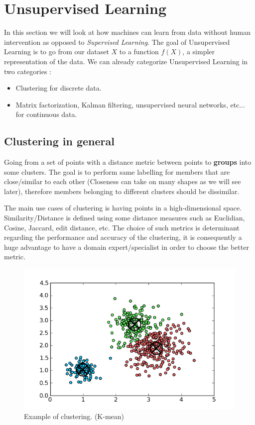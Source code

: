 

\section{Unsupervised Learning}

In this section we will look at how machines can learn from data without human intervention as opposed to \emph{Supervised Learning}. The goal of Unsupervised Learning is to go from our dataset $X$ to a function $f(X)$, a simpler representation of the data. We can already categorize Unsupervised Learning in two categories :
\begin{itemize}
	\item Clustering for discrete data.
	\item Matrix factorization, Kalman filtering, unsupervised neural networks, etc... for continuous data.
\end{itemize}

\subsection{Clustering in general}

Going from a set of points with a distance metric between points to \textbf{groups} into some clusters. The goal is to perform same labelling for members that are close/similar to each other (Closeness can take on many shapes as we will see later), therefore members belonging to different clusters should be dissimilar. 

The main use cases of clustering is having points in a high-dimensional space. Similarity/Distance is defined using some distance measures such as Euclidian, Cosine, Jaccard, edit distance, etc. The choice of such metrics is determinant regarding the performance and accuracy of the clustering, it is consequently a huge advantage to have a domain expert/specialist in order to choose the better metric.

\begin{figure}[H]%
 \centering
 \includegraphics[width=13cm]{./img/09/clustering}
 \caption{\label{pic:clustering} Example of clustering. (K-mean)}
\end{figure}


